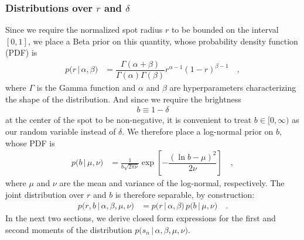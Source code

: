 \documentclass[modern]{aastex62}
\begin{document}
\subsubsection{Distributions over $r$ and $\delta$}
%
Since we require the normalized spot radius $r$ to be bounded
on the interval $[0, 1]$, we place a Beta prior on this quantity, whose
probability density function (PDF) is
%
\begin{align}
    p \big(r \, \big| \, \alpha, \beta \big)
     & =
    \dfrac{\Gamma(\alpha + \beta)}{\Gamma(\alpha)\Gamma(\beta)}
    r^{\alpha - 1}
    (1 - r)^{\beta - 1}
    \quad,
\end{align}
%
where $\Gamma$ is the Gamma function and $\alpha$ and $\beta$ are
hyperparameters characterizing the shape of the distribution.
%
And since we require the brightness
%
\begin{align}
    b \equiv 1 - \delta
\end{align}
%
at the center of the spot to
be non-negative, it is convenient to treat $b \in [0, \infty)$ as our
random variable instead of $\delta$. We therefore place a log-normal
prior on $b$, whose PDF is
%
\begin{align}
    \label{eq:lognormal}
    p \big(b \, \big| \, \mu, \nu \big)
     & =
    \frac{1}{b\sqrt{2\pi\nu}}
    \exp\left[
        -\dfrac{\left(\ln b - \mu\right)^2}{2\nu}
        \right]
    \quad,
\end{align}
%
where $\mu$ and $\nu$ are the mean and variance of the log-normal, respectively.
The joint distribution over $r$ and $b$ is therefore separable,
by construction:
%
\begin{align}
    p \big( r, b \, \big| \, \alpha, \beta, \mu, \nu \big)
     & =
    p \big(r \, \big| \, \alpha, \beta \big)
    \,
    p \big(b \, \big| \, \mu, \nu \big)
    \quad.
\end{align}
%
In the next two sections, we derive closed form expressions for the first
and second moments of the distribution
%
$p \big( s_{n} \, \big| \, \alpha, \beta, \mu, \nu \big)$.
\end{document}
